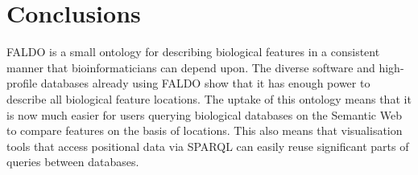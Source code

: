 \section*{Conclusions}
FALDO is a small ontology for describing biological features in a consistent manner that bioinformaticians can depend upon.
The diverse software and high-profile databases already using FALDO show that it has enough power to describe all biological feature locations.
The uptake of this ontology means that it is now much easier for users querying biological databases on the Semantic Web to compare features on the basis of locations.
This also means that visualisation tools that access positional data via SPARQL can easily reuse significant parts of queries between databases.

